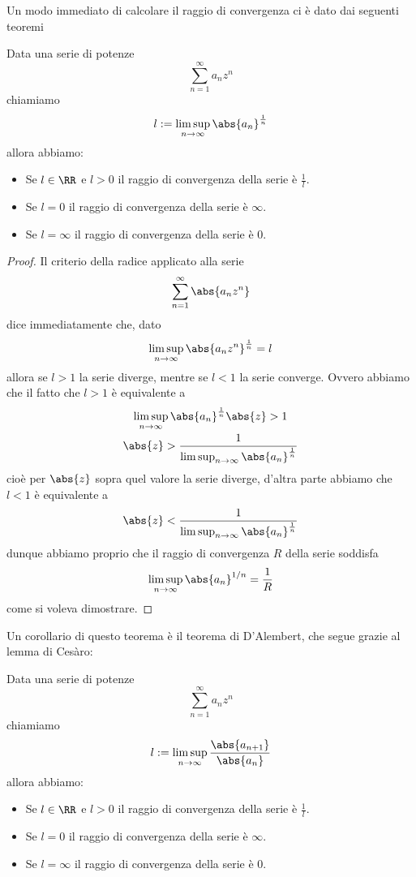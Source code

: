 \documentclass[11pt]{scrartcl}
\begin{document}
	Un modo immediato di calcolare il raggio di convergenza ci è dato dai seguenti teoremi
	\begin{theorem}
		Data una serie di potenze
		$$\sum_{n=1}^\infty a_nz^n$$
		chiamiamo
		$$l:=\limsup_{n\to\infty}\abs{a_n}^{\frac{1}{n}}$$
		allora abbiamo:
		\begin{itemize}
			\item Se $l\in\RR$ e $l>0$ il raggio di convergenza della serie è $\frac{1}{l}$.
			\item Se $l=0$ il raggio di convergenza della serie è $\infty$.
			\item Se $l=\infty$ il raggio di convergenza della serie è $0$.
		\end{itemize}
	\end{theorem}
	\begin{proof}
		Il criterio della radice applicato alla serie 
		$$\sum_{n=1}^{\infty}\abs{a_n z^n}$$
		dice immediatamente che, dato
		$$\limsup_{n\to\infty} \abs{a_n z^n}^{\frac{1}{n}}=l$$
		allora se $l>1$ la serie diverge, mentre se $l<1$ la serie converge. Ovvero abbiamo che il fatto che $l>1$ è equivalente a
		\begin{gather*}
			\limsup_{n\to\infty}\abs{a_n}^{\frac{1}{n}}\abs{z}>1 \\
			\abs{z}>\frac{1}{\limsup_{n\to\infty} \abs{a_n}^{\frac{1}{n}}}
		\end{gather*}
		cioè per $\abs{z}$ sopra quel valore la serie diverge, d'altra parte abbiamo che $l<1$ è equivalente a
		$$\abs{z}<\frac{1}{\limsup_{n\to\infty} \abs{a_n}^{\frac{1}{n}}}$$
		dunque abbiamo proprio che il raggio di convergenza $R$ della serie soddisfa
		$$\limsup_{n\to\infty}\abs{a_n}^{1/n}=\frac{1}{R}$$
		come si voleva dimostrare.
	\end{proof}
	Un corollario di questo teorema è il teorema di D'Alembert, che segue grazie al lemma di Cesàro:
	\begin{corollary}[D'Alembert]
		Data una serie di potenze
		$$\sum_{n=1}^\infty a_nz^n$$
		chiamiamo
		$$l:=\limsup_{n\to\infty}\frac{\abs{a_{n+1}}}{\abs{a_n}}$$
		allora abbiamo:
		\begin{itemize}
			\item Se $l\in\RR$ e $l>0$ il raggio di convergenza della serie è $\frac{1}{l}$.
			\item Se $l=0$ il raggio di convergenza della serie è $\infty$.
			\item Se $l=\infty$ il raggio di convergenza della serie è $0$.
		\end{itemize}
	\end{corollary}
\end{document}
